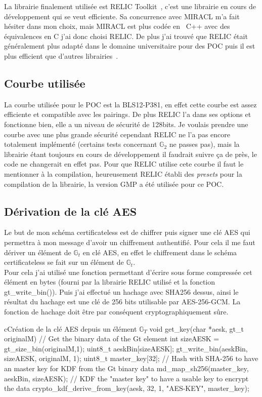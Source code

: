 La librairie finalement utilisée est RELIC Toolkit~\cite{relic-toolkit}, c'est une librairie en cours de développement qui se veut efficiente. Sa concurrence avec MIRACL m'a fait hésiter dans mon choix, mais MIRACL est plus codée en~ C++ avec des équivalences en C j'ai donc choisi RELIC. De plus j'ai trouvé que RELIC était généralement plus adapté dans le domaine universitaire pour des POC puis il est plus efficient que d'autres librairies~\cite{performanceRELIC}.
\subsection{Courbe utilisée}
La courbe utilisée pour le POC est la BLS12-P381, en effet cette courbe est assez efficiente et compatible avec les pairings. De plus RELIC l'a dans ses options et fonctionne bien, elle a un niveau de sécurité de 128bits. Je voulais prendre une courbe avec une plus grande sécurité cependant RELIC ne l'a pas encore totalement implémenté (certains tests concernant $\mathbb{G}_2$ ne passes pas), mais la librairie étant toujours en cours de développement il faudrait suivre ça de près, le code ne changerait en effet pas. Pour que RELIC utilise cete courbe il faut le mentionner à la compilation, heureusement RELIC établi des \textit{presets} pour la compilation de la librairie, la version GMP a été utilisée pour ce POC.
\subsection{Dérivation de la clé AES}
Le but de mon schéma certificateless est de chiffrer puis signer une clé AES qui permettra à mon message d'avoir un chiffrement authentifié. Pour cela il me faut dériver un élément de $\mathbb{G}_t$ en clé AES, en effet le chiffrement dans le schéma certificateless se fait sur un élément de $\mathbb{G}_t$.\\
Pour cela j'ai utilisé une fonction permettant d'écrire sous forme compressée cet élément en bytes (fourni par la librairie RELIC utilisé et la fonction gt\_write\_bin()). Puis j'ai effectué un hachage avec SHA256 dessus, ainsi le résultat du hachage est une clé de 256 bits utilisable par AES-256-GCM. La fonction de hachage doit être par conséquent cryptographiquement sûre.

\begin{sourcebox}{c}{Création de la clé AES depuis un élément $\mathbb{G}_T$}
	void get_key(char *aesk, gt_t originalM) {
		// Get the binary data of the Gt element
		int sizeAESK = gt_size_bin(originalM,1);
		uint8_t aeskBin[sizeAESK];
		gt_write_bin(aeskBin, sizeAESK, originalM, 1);
		uint8_t master_key[32];
		// Hash with SHA-256 to have an master key for KDF from the Gt binary data
		md_map_sh256(master_key, aeskBin, sizeAESK);
		// KDF the "master key" to have a usable key to encrypt the data
		crypto_kdf_derive_from_key(aesk, 32, 1, "AES-KEY", master_key);
	}
\end{sourcebox}

